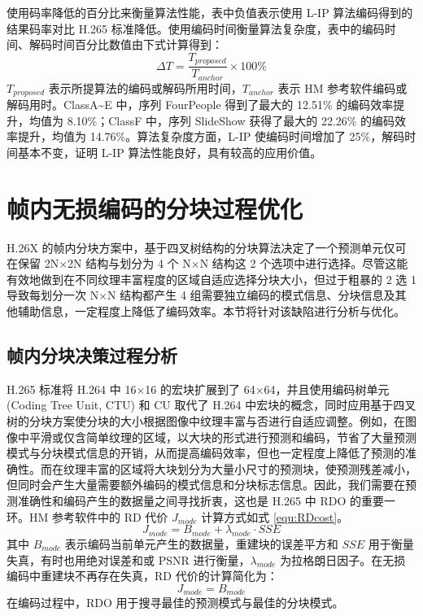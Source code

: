使用码率降低的百分比来衡量算法性能，表中负值表示使用 L-IP 算法编码得到的结果码率对比 H.265 标准降低。使用编码时间衡量算法复杂度，表中的编码时间、解码时间百分比数值由下式计算得到：
\begin{equation}
    \Delta T=\frac{T_{proposed}}{T_{anchor}}\times 100\%
\end{equation}
$T_{proposed}$ 表示所提算法的编码或解码所用时间，$T_{anchor}$ 表示 HM 参考软件编码或解码用时。ClassA\textasciitilde E 中，序列 FourPeople 得到了最大的 12.51\% 的编码效率提升，均值为 8.10\%；ClassF 中，序列 SlideShow 获得了最大的 22.26\% 的编码效率提升，均值为 14.76\%。算法复杂度方面，L-IP 使编码时间增加了 25\%，解码时间基本不变，证明 L-IP 算法性能良好，具有较高的应用价值。

\section{帧内无损编码的分块过程优化}
H.26X 的帧内分块方案中，基于四叉树结构的分块算法决定了一个预测单元仅可在保留 2N$\times$2N 结构与划分为 4 个 N$\times$N 结构这 2 个选项中进行选择。尽管这能有效地做到在不同纹理丰富程度的区域自适应选择分块大小，但过于粗暴的 2 选 1 导致每划分一次 N$\times$N 结构都产生 4 组需要独立编码的模式信息、分块信息及其他辅助信息，一定程度上降低了编码效率。本节将针对该缺陷进行分析与优化。

\subsection{帧内分块决策过程分析}
H.265 标准将 H.264 中 16$\times$16 的宏块扩展到了 64$\times$64，并且使用编码树单元 (Coding Tree Unit, CTU) 和 CU 取代了 H.264 中宏块的概念，同时应用基于四叉树的分块方案使分块的大小根据图像中纹理丰富与否进行自适应调整。例如，在图像中平滑或仅含简单纹理的区域，以大块的形式进行预测和编码，节省了大量预测模式与分块模式信息的开销，从而提高编码效率，但也一定程度上降低了预测的准确性。而在纹理丰富的区域将大块划分为大量小尺寸的预测块，使预测残差减小，但同时会产生大量需要额外编码的模式信息和分块标志信息。因此，我们需要在预测准确性和编码产生的数据量之间寻找折衷，这也是 H.265 中 RDO 的重要一环。HM 参考软件中的 RD 代价 $J_{mode}$ 计算方式如式 \ref{equ:RDcost}。
\begin{equation}
    J_{mode}=B_{mode}+\lambda_{mode}\cdot SSE
    \label{equ:RDcost}
\end{equation}
其中 $B_{mode}$ 表示编码当前单元产生的数据量，重建块的误差平方和 $SSE$ 用于衡量失真，有时也用绝对误差和或 PSNR 进行衡量，$\lambda_{mode}$ 为拉格朗日因子。在无损编码中重建块不再存在失真，RD 代价的计算简化为：
\begin{equation}
    J_{mode}=B_{mode}
\end{equation}
在编码过程中，RDO 用于搜寻最佳的预测模式与最佳的分块模式。

